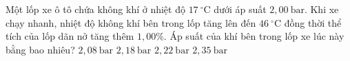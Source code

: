 \begin{ex}
Một lốp xe ô tô chứa không khí ở nhiệt độ $17\ ^\circ\mathrm{C}$ dưới áp suất $2,00\ \mathrm{bar}$. Khi xe chạy nhanh, nhiệt độ không khí bên trong lốp tăng lên đến $46\ ^\circ\mathrm{C}$ đồng thời thể tích của lốp dãn nở tăng thêm $1,00\%$. Áp suất của khí bên trong lốp xe lúc này bằng bao nhiêu?
\choice
{$2,08\ \mathrm{bar}$}
{\True $2,18\ \mathrm{bar}$}
{$2,22\ \mathrm{bar}$}
{$2,35\ \mathrm{bar}$}
\end{ex}

